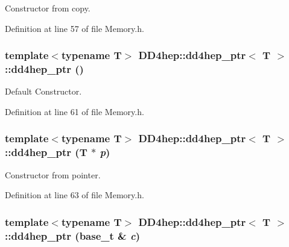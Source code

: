 Constructor from copy. 

Definition at line 57 of file Memory.h.\hypertarget{class_d_d4hep_1_1dd4hep__ptr_a794418a47e2b889172eca52c9b42f2f9}{
\subsubsection[{dd4hep\_\-ptr}]{\setlength{\rightskip}{0pt plus 5cm}template$<$typename T$>$ {\bf DD4hep::dd4hep\_\-ptr}$<$ {\bf T} $>$::{\bf dd4hep\_\-ptr} ()}}
\label{class_d_d4hep_1_1dd4hep__ptr_a794418a47e2b889172eca52c9b42f2f9}


Default Constructor. 

Definition at line 61 of file Memory.h.\hypertarget{class_d_d4hep_1_1dd4hep__ptr_ab9f2520963ed15270c9fbf034fbc15a9}{
\subsubsection[{dd4hep\_\-ptr}]{\setlength{\rightskip}{0pt plus 5cm}template$<$typename T$>$ {\bf DD4hep::dd4hep\_\-ptr}$<$ {\bf T} $>$::{\bf dd4hep\_\-ptr} ({\bf T} $\ast$ {\em p})}}
\label{class_d_d4hep_1_1dd4hep__ptr_ab9f2520963ed15270c9fbf034fbc15a9}


Constructor from pointer. 

Definition at line 63 of file Memory.h.\hypertarget{class_d_d4hep_1_1dd4hep__ptr_a37f6577690b416db238cf3153dbb966e}{
\subsubsection[{dd4hep\_\-ptr}]{\setlength{\rightskip}{0pt plus 5cm}template$<$typename T$>$ {\bf DD4hep::dd4hep\_\-ptr}$<$ {\bf T} $>$::{\bf dd4hep\_\-ptr} ({\bf base\_\-t} \& {\em c})}}
\label{class_d_d4hep_1_1dd4hep__ptr_a37f6577690b416db238cf3153dbb966e}


